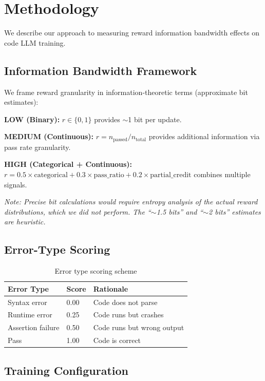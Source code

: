 \section{Methodology}
\label{sec:methodology}

We describe our approach to measuring reward information bandwidth effects on code LLM training.

\subsection{Information Bandwidth Framework}

We frame reward granularity in information-theoretic terms (approximate bit estimates):

\textbf{LOW (Binary):} $r \in \{0, 1\}$ provides $\sim$1 bit per update.

\textbf{MEDIUM (Continuous):} $r = n_{\text{passed}} / n_{\text{total}}$ provides additional information via pass rate granularity.

\textbf{HIGH (Categorical + Continuous):} $r = 0.5 \times \text{categorical} + 0.3 \times \text{pass\_ratio} + 0.2 \times \text{partial\_credit}$ combines multiple signals.

\textit{Note: Precise bit calculations would require entropy analysis of the actual reward distributions, which we did not perform. The ``$\sim$1.5 bits'' and ``$\sim$2 bits'' estimates are heuristic.}

\subsection{Error-Type Scoring}

\begin{table}[h]
\centering
\caption{Error type scoring scheme}
\label{tab:error_scores}
\begin{tabular}{lll}
\toprule
Error Type & Score & Rationale \\
\midrule
Syntax error & 0.00 & Code does not parse \\
Runtime error & 0.25 & Code runs but crashes \\
Assertion failure & 0.50 & Code runs but wrong output \\
Pass & 1.00 & Code is correct \\
\bottomrule
\end{tabular}
\end{table}

\subsection{Training Configuration}

